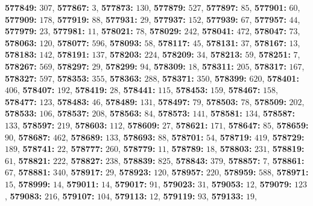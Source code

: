 \textsf{\bfseries 577849:} $307$, \textsf{\bfseries 577867:} $3$, \textsf{\bfseries 577873:} $130$, \textsf{\bfseries 577879:} $527$, \textsf{\bfseries 577897:} $85$, \textsf{\bfseries 577901:} $60$, \textsf{\bfseries 577909:} $178$, \textsf{\bfseries 577919:} $88$, \textsf{\bfseries 577931:} $29$, \textsf{\bfseries 577937:} $152$, \textsf{\bfseries 577939:} $67$, \textsf{\bfseries 577957:} $44$, \textsf{\bfseries 577979:} $23$, \textsf{\bfseries 577981:} $11$, \textsf{\bfseries 578021:} $78$, \textsf{\bfseries 578029:} $242$, \textsf{\bfseries 578041:} $472$, \textsf{\bfseries 578047:} $73$, \textsf{\bfseries 578063:} $120$, \textsf{\bfseries 578077:} $596$, \textsf{\bfseries 578093:} $58$, \textsf{\bfseries 578117:} $45$, \textsf{\bfseries 578131:} $37$, \textsf{\bfseries 578167:} $13$, \textsf{\bfseries 578183:} $142$, \textsf{\bfseries 578191:} $137$, \textsf{\bfseries 578203:} $224$, \textsf{\bfseries 578209:} $34$, \textsf{\bfseries 578213:} $59$, \textsf{\bfseries 578251:} $7$, \textsf{\bfseries 578267:} $569$, \textsf{\bfseries 578297:} $29$, \textsf{\bfseries 578299:} $94$, \textsf{\bfseries 578309:} $18$, \textsf{\bfseries 578311:} $205$, \textsf{\bfseries 578317:} $167$, \textsf{\bfseries 578327:} $597$, \textsf{\bfseries 578353:} $355$, \textsf{\bfseries 578363:} $288$, \textsf{\bfseries 578371:} $350$, \textsf{\bfseries 578399:} $620$, \textsf{\bfseries 578401:} $406$, \textsf{\bfseries 578407:} $192$, \textsf{\bfseries 578419:} $28$, \textsf{\bfseries 578441:} $115$, \textsf{\bfseries 578453:} $159$, \textsf{\bfseries 578467:} $158$, \textsf{\bfseries 578477:} $123$, \textsf{\bfseries 578483:} $46$, \textsf{\bfseries 578489:} $131$, \textsf{\bfseries 578497:} $79$, \textsf{\bfseries 578503:} $78$, \textsf{\bfseries 578509:} $202$, \textsf{\bfseries 578533:} $106$, \textsf{\bfseries 578537:} $208$, \textsf{\bfseries 578563:} $84$, \textsf{\bfseries 578573:} $141$, \textsf{\bfseries 578581:} $134$, \textsf{\bfseries 578587:} $133$, \textsf{\bfseries 578597:} $219$, \textsf{\bfseries 578603:} $112$, \textsf{\bfseries 578609:} $27$, \textsf{\bfseries 578621:} $171$, \textsf{\bfseries 578647:} $85$, \textsf{\bfseries 578659:} $90$, \textsf{\bfseries 578687:} $462$, \textsf{\bfseries 578689:} $133$, \textsf{\bfseries 578693:} $88$, \textsf{\bfseries 578701:} $54$, \textsf{\bfseries 578719:} $419$, \textsf{\bfseries 578729:} $189$, \textsf{\bfseries 578741:} $22$, \textsf{\bfseries 578777:} $260$, \textsf{\bfseries 578779:} $11$, \textsf{\bfseries 578789:} $18$, \textsf{\bfseries 578803:} $231$, \textsf{\bfseries 578819:} $61$, \textsf{\bfseries 578821:} $222$, \textsf{\bfseries 578827:} $238$, \textsf{\bfseries 578839:} $825$, \textsf{\bfseries 578843:} $379$, \textsf{\bfseries 578857:} $7$, \textsf{\bfseries 578861:} $67$, \textsf{\bfseries 578881:} $340$, \textsf{\bfseries 578917:} $29$, \textsf{\bfseries 578923:} $120$, \textsf{\bfseries 578957:} $220$, \textsf{\bfseries 578959:} $588$, \textsf{\bfseries 578971:} $15$, \textsf{\bfseries 578999:} $14$, \textsf{\bfseries 579011:} $14$, \textsf{\bfseries 579017:} $91$, \textsf{\bfseries 579023:} $31$, \textsf{\bfseries 579053:} $12$, \textsf{\bfseries 579079:} $123$, \textsf{\bfseries 579083:} $216$, \textsf{\bfseries 579107:} $104$, \textsf{\bfseries 579113:} $12$, \textsf{\bfseries 579119:} $93$, \textsf{\bfseries 579133:} $19$, 
